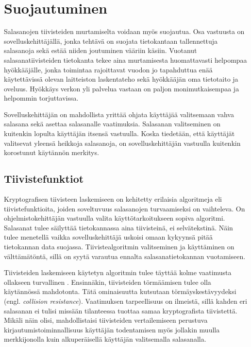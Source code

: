 \chapter{Suojautuminen\label{ch:suojautuminen}}

Salasanojen tiivisteiden murtamiselta voidaan myös suojautua. Osa vastuusta on sovelluskehittäjällä, jonka tehtävä on suojata tietokantaan tallennettuja salasanoja sekä estää niiden joutuminen vääriin käsiin. Vuotanut salasanatiivisteiden tietokanta tekee aina murtamisesta huomattavasti helpompaa hyökkääjälle, jonka toimintaa rajoittavat vuodon jo tapahduttua enää käytettävissä olevan laitteiston laskentateho sekä hyökkääjän oma tietotaito ja oveluus. Hyökkäys verkon yli palvelua vastaan on paljon monimutkaisempaa ja helpommin torjuttavissa.

Sovelluskehittäjän on mahdollista yrittää ohjata käyttäjää valitsemaan vahva salasana sekä asettaa salasanalle vaatimuksia. Salasanan valitseminen on kuitenkin lopulta käyttäjän itsensä vastuulla. Koska tiedetään, että käyttäjät valitsevat yleensä heikkoja salasanoja, on sovelluskehittäjän vastuulla kuitenkin korostunut käytännön merkitys.

\section{Tiivistefunktiot\label{sec:tiivistefunktiot}}

Kryptografisen tiivisteen laskemiseen on kehitetty erilaisia algoritmeja eli tiivistefunktioita, joiden soveltuvuus salasanojen turvaamiseksi on vaihteleva. On ohjelmistokehittäjän vastuulla valita käyttötarkoitukseen sopiva algoritmi. Salasanat tulee säilyttää tietokannassa aina tiivisteinä, ei selvätekstinä. Näin tulee menetellä vaikka sovelluskehittäjä uskoisi omaan kykyynsä pitää tietokannan data suojassa. Tiivistealgoritmin valitseminen ja käyttäminen on välttämätöntä, sillä on syytä varautua ennalta salasanatietokannan vuotamiseen. 

Tiivisteiden laskemiseen käytetyn algoritmin tulee täyttää kolme vaatimusta ollakseen turvallinen \citep{dang_recommendation_2012}. Ensinnäkin, tiivisteiden törmäämisen tulee olla käytännössä mahdotonta. Tätä ominaisuutta kutsutaan törmäyskestävyydeksi (engl. \textit{collision resistance}). Vaatimuksen tarpeellisuus on ilmeistä, sillä kahden eri salasanan ei tulisi missään tilanteessa tuottaa samaa kryptografista tiivistettä. Mikäli näin olisi, mahdollistaisi tiivisteiden vertailemiseen perustuva kirjautumistoiminnallisuus käyttäjän todentamisen myös jollakin muulla merkkijonolla kuin alkuperäisellä käyttäjän valitsemalla salasanalla.

